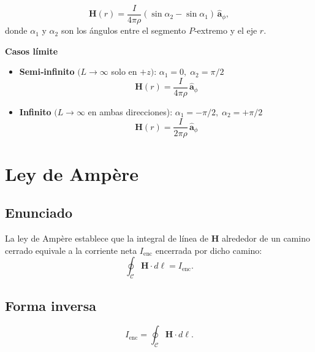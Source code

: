 \documentclass[11pt]{article}
\begin{document}
\[
\mathbf{H}(r)=
\frac{I}{4\pi {\rho}}\left(
  \sin\alpha_{2}-\sin\alpha_{1}
\right)\,\hat{\boldsymbol{a}}_{\phi},
\]
donde
\(\alpha_{1}\) y \(\alpha_{2}\) son los ángulos
entre el segmento \(P\)‑extremo y el eje \(r\).

\textbf{Casos límite}
\begin{itemize}
  \item {\bf Semi‑infinito} \((L\to\infty\) solo en \(+z)\):
        \(\alpha_{1}=0,\;\alpha_{2}=\pi/2\)
        \[
        \boxed{\mathbf{H}(r)=\dfrac{I}{4\pi {\rho}}\,\hat{\boldsymbol{a}}_{\phi}}
        \]
  \item {\bf Infinito} \((L\to\infty\) en ambas direcciones):
        \(\alpha_{1}=-\pi/2,\;\alpha_{2}=+\pi/2\)
        \[
        \boxed{\mathbf{H}(r)=\dfrac{I}{2\pi {\rho}}\,\hat{\boldsymbol{a}}_{\phi}}
        \]
\end{itemize}

\section{Ley de Ampère}
\subsection*{Enunciado}
La ley de Ampère establece que la integral de línea de \(\mathbf{H}\)
alrededor de un camino cerrado equivale a la corriente neta \(I_{\mathrm{enc}}\)
encerrada por dicho camino:
\[
\oint_{\mathcal{C}}\mathbf{H}\cdot d\boldsymbol{\ell}= I_{\mathrm{enc}}.
\]

\subsection*{Forma inversa}
\[
I_{\mathrm{enc}}=\oint_{\mathcal{C}}\mathbf{H}\cdot d\boldsymbol{\ell}.
\]

\end{document}
